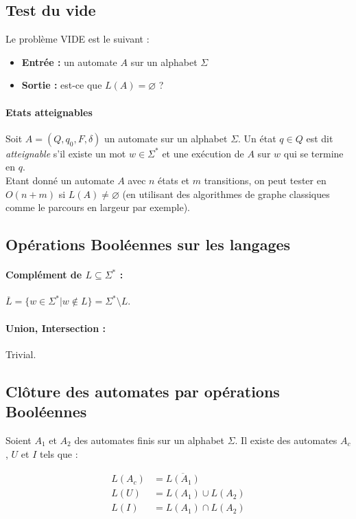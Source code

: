 \documentclass[a4paper]{article}
\begin{document}
  \subsection{Test du vide}
  Le problème VIDE est le suivant :
  \begin{itemize}
    \item \textbf{Entrée :} un automate $A$ sur un alphabet $\Sigma$
    \item \textbf{Sortie :} est-ce que $L(A) = \varnothing$ ?
  \end{itemize}

  \paragraph{Etats atteignables} Soit $A = (Q, q_0, F, \delta)$ un automate sur un
  alphabet $\Sigma$. Un état $q\in Q$ est dit \textit{atteignable} s'il existe
  un mot $w \in \Sigma^*$ et une exécution de $A$ sur $w$ qui se termine en $q$.\\

  Etant donné un automate $A$ avec $n$ états et $m$ transitions, on peut tester
  en $O(n+m)$ si $L(A) \neq \varnothing$ (en utilisant des algorithmes de graphe
  classiques comme le parcours en largeur par exemple).

  \subsection{Opérations Booléennes sur les langages}
  \paragraph{Complément de $L \subseteq \Sigma^*$ :} $\overline{L} = \{ w \in \Sigma^* | w \not \in L\} = \Sigma^* \setminus L$.

  \paragraph{Union, Intersection :} Trivial.

  \subsection{Clôture des automates par opérations Booléennes}
  Soient $A_1$ et $A_2$ des automates finis sur un alphabet $\Sigma$. Il existe
  des automates $A_c$, $U$ et $I$ tels que :
  \begin{center}
    \begin{align*}
      L(A_c) & = \overline{L(A_1)}\\
      L(U) & = L(A_1) \cup L(A_2)\\
      L(I) & = L(A_1) \cap L(A_2)
    \end{align*}
  \end{center}
\end{document}
